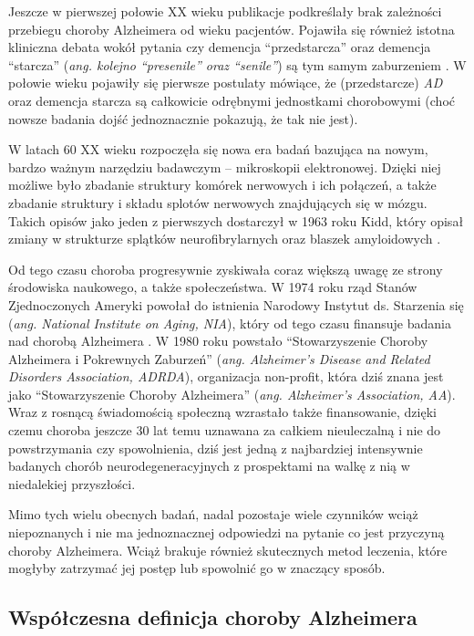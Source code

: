 Jeszcze w pierwszej połowie XX wieku publikacje podkreślały brak zależności przebiegu choroby Alzheimera od wieku pacjentów.
Pojawiła się również istotna kliniczna debata wokół pytania czy demencja ``przedstarcza'' oraz demencja ``starcza'' (\emph{ang. kolejno ``presenile'' oraz ``senile''}) są tym samym zaburzeniem \cite{jellinger2006alzheimer}.
W połowie wieku pojawiły się pierwsze postulaty mówiące, że (przedstarcze) \emph{AD} oraz demencja starcza są całkowicie odrębnymi jednostkami chorobowymi (choć nowsze badania dojść jednoznacznie pokazują, że tak nie jest).

W latach 60 XX wieku rozpoczęła się nowa era badań bazująca na nowym, bardzo ważnym narzędziu badawczym -- mikroskopii elektronowej.
Dzięki niej możliwe było zbadanie struktury komórek nerwowych i ich połączeń, a także zbadanie struktury i składu splotów nerwowych znajdujących się w mózgu.
Takich opisów jako jeden z pierwszych dostarczył w 1963 roku Kidd, który opisał zmiany w strukturze splątków neurofibrylarnych oraz blaszek amyloidowych \cite{kidd1963paired}.

Od tego czasu choroba progresywnie zyskiwała coraz większą uwagę ze strony środowiska naukowego, a także społeczeństwa.
W 1974 roku rząd Stanów Zjednoczonych Ameryki powołał do istnienia Narodowy Instytut ds. Starzenia się (\emph{ang. National Institute on Aging, NIA}), który od tego czasu finansuje badania nad chorobą Alzheimera \cite{marx1974aging}.
W 1980 roku powstało ``Stowarzyszenie Choroby Alzheimera i Pokrewnych Zaburzeń'' (\emph{ang. Alzheimer's Disease and Related Disorders Association, ADRDA}), organizacja non-profit, która dziś znana jest jako ``Stowarzyszenie Choroby Alzheimera'' (\emph{ang. Alzheimer's Association, AA}).
Wraz z rosnącą świadomością społeczną wzrastało także finansowanie, dzięki czemu choroba jeszcze 30 lat temu uznawana za całkiem nieuleczalną i nie do powstrzymania czy spowolnienia, dziś jest jedną z najbardziej intensywnie badanych chorób neurodegeneracyjnych z prospektami na walkę z nią w niedalekiej przyszłości.

Mimo tych wielu obecnych badań, nadal pozostaje wiele czynników wciąż niepoznanych i nie ma jednoznacznej odpowiedzi na pytanie co jest przyczyną choroby Alzheimera.
Wciąż brakuje również skutecznych metod leczenia, które mogłyby zatrzymać jej postęp lub spowolnić go w znaczący sposób.

\subsection{Współczesna definicja choroby Alzheimera}

